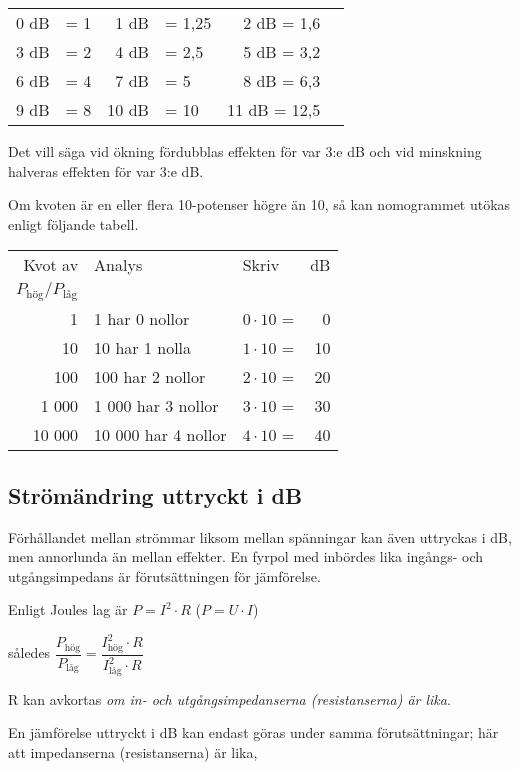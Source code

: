 \begin{center}
\begin{tabular}{rlrlrl}
0 dB & = 1 &  1 dB & =  1,25 & 2 dB = 1,6 \\
3 dB & = 2 &  4 dB & =  2,5  & 5 dB = 3,2 \\
6 dB & = 4 &  7 dB & =  5    & 8 dB = 6,3 \\
9 dB & = 8 & 10 dB & = 10    & 11 dB = 12,5
\end{tabular}
\end{center}

Det vill säga vid ökning fördubblas effekten för var 3:e dB och vid minskning
halveras effekten för var 3:e dB.

Om kvoten är en eller flera 10-potenser högre än 10, så kan nomogrammet utökas
enligt följande tabell.

\begin{tabular}{rllr}
Kvot av & Analys             & Skriv            & dB \\
\(P_\text{hög}/P_\text{låg}\) &          &                  &    \\
     1 & 1 har 0 nollor      & \(0 \cdot 10\) = &  0 \\
    10 & 10 har 1 nolla      & \(1 \cdot 10\) = & 10 \\
   100 & 100 har 2 nollor    & \(2 \cdot 10\) = & 20 \\
 1 000 &  1 000 har 3 nollor & \(3 \cdot 10\) = & 30 \\
10 000 & 10 000 har 4 nollor & \(4 \cdot 10\) = & 40
\end{tabular}

\subsection{Strömändring uttryckt i dB}

Förhållandet mellan strömmar liksom mellan spänningar kan även uttryckas i dB,
men annorlunda än mellan effekter.
En fyrpol med inbördes lika ingångs- och utgångsimpedans är förutsättningen för
jämförelse.

Enligt Joules lag är \(P = I^2 \cdot R\) (\(P = U \cdot I\))

således \(\dfrac{P_\text{hög}}{P_\text{l{\aa}g}} = \dfrac{I_\text{hög}^2 \cdot R}{I_\text{l{\aa}g}^2 \cdot R}\)

R kan avkortas \emph{om in- och utgångsimpedanserna (resistanserna) är lika}.

En jämförelse uttryckt i dB kan endast göras under samma förutsättningar;
här att impedanserna (resistanserna) är lika,


